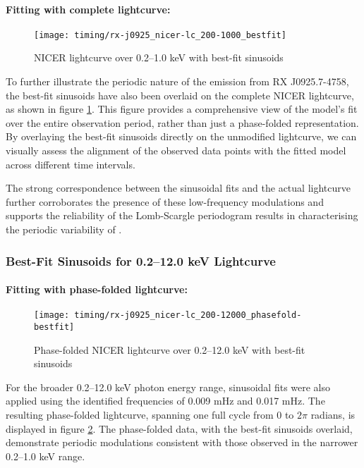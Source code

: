 				\paragraph{Fitting with complete lightcurve:}
				\begin{figure}[h!]
					\centering
					\texttt{[image: timing/rx-j0925\_nicer-lc\_200-1000\_bestfit]}
					\caption{NICER lightcurve over 0.2--1.0 keV with best-fit sinusoids}
					\label{result:lc-mrvel-nicer:200-1000-bestfit}
				\end{figure}
				To further illustrate the periodic nature of the emission from RX J0925.7-4758, the best-fit sinusoids have also been overlaid on the complete NICER lightcurve, as shown in figure \ref{result:lc-mrvel-nicer:200-1000-bestfit}. This figure provides a comprehensive view of the model's fit over the entire observation period, rather than just a phase-folded representation. By overlaying the best-fit sinusoids directly on the unmodified lightcurve, we can visually assess the alignment of the observed data points with the fitted model across different time intervals.
				
				The strong correspondence between the sinusoidal fits and the actual lightcurve further corroborates the presence of these low-frequency modulations and supports the reliability of the Lomb-Scargle periodogram results in characterising the periodic variability of \source.
				
			\subsubsection{Best-Fit Sinusoids for 0.2--12.0 keV Lightcurve}
				\paragraph{Fitting with phase-folded lightcurve:}				
				\begin{figure}[h!]
					\centering
					\texttt{[image: timing/rx-j0925\_nicer-lc\_200-12000\_phasefold-bestfit]}
					\caption{Phase-folded NICER lightcurve over 0.2--12.0 keV with best-fit sinusoids}
					\label{result:lc-phase-fold-mrvel-nicer:200-12000-bestfit}
				\end{figure}
				For the broader 0.2--12.0 keV photon energy range, sinusoidal fits were also applied using the identified frequencies of 0.009 mHz and 0.017 mHz. The resulting phase-folded lightcurve, spanning one full cycle from 0 to $2\pi$ radians, is displayed in figure \ref{result:lc-phase-fold-mrvel-nicer:200-12000-bestfit}. The phase-folded data, with the best-fit sinusoids overlaid, demonstrate periodic modulations consistent with those observed in the narrower 0.2--1.0 keV range. %
				
